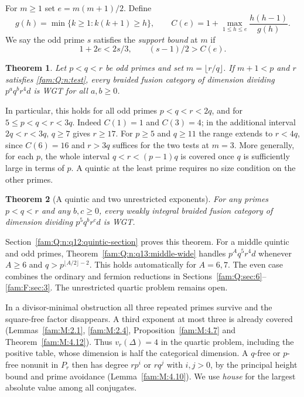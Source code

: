 \documentclass[11pt,a4paper]{article}
\numberwithin{equation}{section}
\newtheorem{theorem}{Theorem}[section]
\theoremstyle{remark}
\begin{document}
For $m\ge1$ set $e=m(m+1)/2$. Define
\[
 g(h)=\min\{k\ge1:k(k+1)\ge h\},\qquad
 C(e)=1+\max_{1\le h\le e}\frac{h(h-1)}{g(h)}.
\]
We say the odd prime $s$ satisfies the \emph{support bound} at $m$
if
\begin{equation}
  1+2e<2s/3,\qquad (s-1)/2>C(e).
  \label{fam:Q:n:test}
\end{equation}

\begin{theorem}\label{fam:Q:1.2}\label{fam:Q:n:quart:main}
Let $p<q<r$ be odd primes and set $m=\lfloor r/q\rfloor$.
If $m+1<p$ and $r$ satisfies \eqref{fam:Q:n:test}, every braided
fusion category of dimension dividing $p^a q^b r^4d$ is WGT for
all $a,b\ge0$.
\end{theorem}
In particular, this holds for all odd primes $p<q<r<2q$, and for
$5\le p<q<r<3q$. Indeed $C(1)=1$ and $C(3)=4$; in the
additional interval $2q<r<3q$, $q\ge7$ gives $r\ge17$.
For $p\ge5$ and $q\ge11$ the range extends to $r<4q$, since
$C(6)=16$ and $r>3q$ suffices for the two tests at $m=3$.
More generally, for each $p$, the whole interval $q<r<(p-1)q$
is covered once $q$ is sufficiently large in terms of $p$.
A quintic at the least prime requires no size condition on the
other primes.
\begin{theorem}[A quintic and two unrestricted exponents]\label{fam:Q:1.3}\label{fam:Q:n:q12:unified}
For any primes $p<q<r$ and any $b,c\ge0$, every weakly integral
braided fusion category of dimension dividing $p^5q^br^cd$ is WGT.
\end{theorem}
Section~\ref{fam:Q:n:q12:quintic-section} proves this theorem. For a
middle quintic and odd primes, Theorem~\ref{fam:Q:n:q13:middle-wide}
handles $p^Aq^5r^4 d$ whenever $A\ge6$ and
$q>p^{\lfloor A/2\rfloor-2}$. This holds automatically for
$A=6,7$. The even case combines the ordinary and fermion reductions in Sections~\ref{fam:Q:sec:6}--\ref{fam:F:sec:3}. The unrestricted quartic problem
remains open.

In a divisor-minimal obstruction all three repeated primes survive and
the square-free factor disappears. A third exponent at most three is
already covered (Lemmas~\ref{fam:M:2.1}, \ref{fam:M:2.4},
Proposition~\ref{fam:M:4.7} and Theorem~\ref{fam:M:4.12}). Thus
$v_r(\Delta)=4$ in the quartic problem, including the positive
table, whose dimension is half the categorical dimension.
A $q$-free or $p$-free nonunit in $P_r$ then has degree $rp^i$
or $rq^j$ with $i,j>0$, by the principal height bound and prime
avoidance (Lemma~\ref{fam:M:4.10}). We use \emph{house} for the
largest absolute value among all conjugates.
\end{document}
